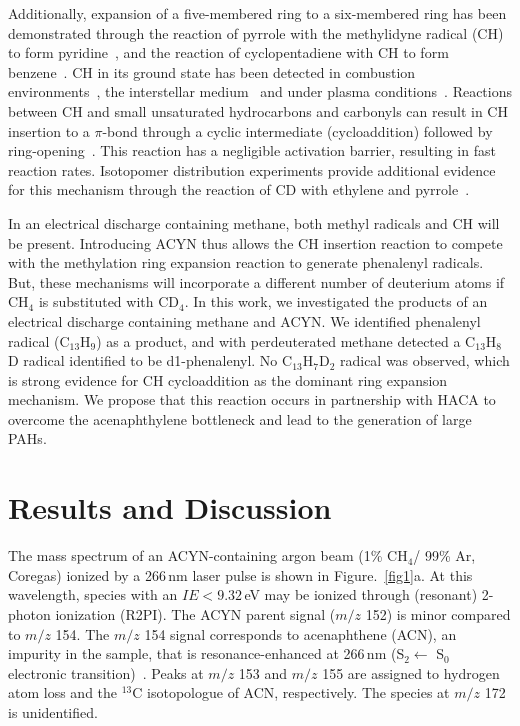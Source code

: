 \documentclass[journal=jacsat,manuscript=article,layout=onecolumn]{achemso}
\begin{document}
Additionally, expansion of a five-membered ring to a six-membered ring has been demonstrated through the reaction of pyrrole with the methylidyne radical (CH) to form pyridine~\cite{soo10}, and the reaction of cyclopentadiene with CH to form benzene~\cite{cas19}. CH in its ground state has been detected in combustion environments~\cite{lov11,tin11,zha12}, the interstellar medium~\cite{ger10,ada41} and under plasma conditions~\cite{zho06}. Reactions between CH and small unsaturated hydrocarbons and carbonyls can result in CH insertion to a $\pi$-bond through a cyclic intermediate (cycloaddition) followed by ring-opening~\cite{gou09,tre13,gou12,tre16,cas19}. This reaction has a negligible activation barrier, resulting in fast reaction rates. Isotopomer distribution experiments provide additional evidence for this mechanism through the reaction of CD with ethylene and pyrrole~\cite{gou09,soo10}. %

In an electrical discharge containing methane, both methyl radicals and CH will be present. Introducing ACYN thus allows the CH insertion reaction to compete with the methylation ring expansion reaction to generate phenalenyl radicals. But, these mechanisms will incorporate a different number of deuterium atoms if CH$_4$ is substituted with CD$_4$. In this work, we investigated the products of an electrical discharge containing methane and ACYN. We identified phenalenyl radical (C$_{13}$H$_9$) as a product, and with perdeuterated methane detected a C$_{13}$H$_8$D radical identified to be d1-phenalenyl. No C$_{13}$H$_7$D$_2$ radical was observed, which is strong evidence for CH cycloaddition as the dominant ring expansion mechanism. We propose that this reaction occurs in partnership with HACA to overcome the acenaphthylene bottleneck and lead to the generation of large PAHs.


\section{Results and Discussion}

The mass spectrum of an ACYN-containing argon beam (1\% CH$_4$/ 99\% Ar, Coregas) ionized by a 266\,nm laser pulse is shown in Figure.~\ref{fig1}a. At this wavelength, species with an $IE < 9.32$\,eV may be ionized through (resonant) 2-photon ionization (R2PI). The ACYN parent signal ($m/z$ 152) is minor compared to $m/z$ 154. The $m/z$ 154 signal corresponds to acenaphthene (ACN), an impurity in the sample, that is resonance-enhanced at 266\,nm (S$_2 \leftarrow$ S$_0$ electronic transition)~\cite{swi91}. Peaks at $m/z$ 153 and $m/z$ 155 are assigned to hydrogen atom loss and the $^{13}$C isotopologue of ACN, respectively. The species at $m/z$ 172 is unidentified.
\end{document}
